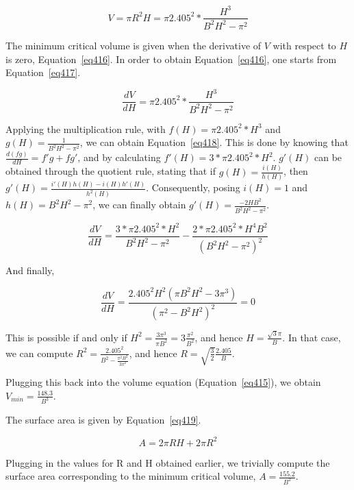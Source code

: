 \begin{equation}\label{eq415}
V = \pi R^2 H = \pi 2.405^2 * \frac{H^3}{B^2H^2-\pi^2}
\end{equation}

The minimum critical volume is given when the derivative of $V$ with respect to $H$ is zero, Equation~\ref{eq416}. In order to obtain Equation~\ref{eq416}, one starts from Equation~\ref{eq417}.

\begin{equation}\label{eq417}
\frac{dV}{dH} = \pi 2.405^2 * \frac{H^3}{B^2H^2-\pi^2}
\end{equation}

Applying the multiplication rule, with $f(H) = \pi 2.405^2 * H^3$ and $g(H) = \frac{1}{B^2H^2-\pi^2}$, we can obtain Equation~\ref{eq418}. This is done by knowing that $\frac{d(fg)}{dH} = f'g + fg'$, and by calculating $f'(H) = 3 * \pi 2.405^2 * H^2$. $g'(H)$ can be obtained through the quotient rule, stating that if $g(H) = \frac{i(H)}{h(H)}$, then $g'(H) = \frac{i'(H)h(H) - i(H)h'(H)}{h^2(H)}$. Consequently, posing $i(H) = 1$ and $h(H) = B^2H^2 - \pi^2$, we can finally obtain $g'(H) = \frac{-2HB^2}{B^2H^2-\pi^2}$.

\begin{equation}\label{eq418}
\frac{dV}{dH} = \frac{3*\pi 2.405^2 * H^2}{B^2H^2-\pi^2} - \frac{2 * \pi 2.405^2 * H^4 B^2}{(B^2H^2-\pi^2)^2}
\end{equation}

And finally,

\begin{equation}\label{eq416}
\frac{dV}{dH} = \frac{2.405^2 H^2(\pi B^2H^2 - 3\pi^3)}{(\pi^2 - B^2H^2)^2} = 0
\end{equation}

This is possible if and only if $H^2 = \frac{3\pi^3}{\pi B^2} = 3\frac{\pi^2}{B^2}$, and hence $H = \frac{\sqrt{3}\pi}{B}$. In that case, we can compute $R^2 = \frac{2.405^2}{B^2-\frac{\pi^2 B^2}{3\pi^2}}$, and hence $R = \sqrt{\frac{3}{2}}\frac{2.405}{B}$.

Plugging this back into the volume equation (Equation~\ref{eq415}), we obtain $V_{min} = \frac{148.3}{B^3}$.

The surface area is given by Equation~\ref{eq419}.

\begin{equation}\label{eq419}
A = 2\pi RH + 2\pi R^2
\end{equation}

Plugging in the values for R and H obtained earlier, we trivially compute the surface area corresponding to the minimum critical volume, $A = \frac{155.2}{B^2}$.
